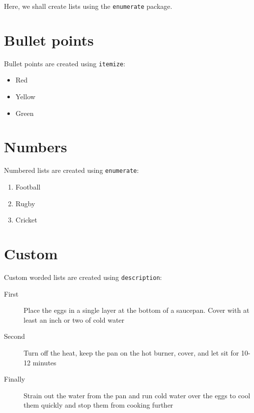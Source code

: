 \documentclass[a4paper,12pt]{article}
\begin{document}
Here, we shall create lists using the \texttt{enumerate} package.

\section{Bullet points}
Bullet points are created using \texttt{itemize}:

\begin{itemize}
  \item Red
  \item Yellow
  \item Green
\end{itemize}

\section{Numbers}
Numbered lists are created using \texttt{enumerate}:

\begin{enumerate}
  \item Football
  \item Rugby
  \item Cricket
\end{enumerate}

\section{Custom}
Custom worded lists are created using \texttt{description}:

\begin{description}
  \item[First] Place the eggs in a single layer at the bottom of a saucepan. Cover with at least an inch or two of cold water
  \item[Second] Turn off the heat, keep the pan on the hot burner, cover, and let sit for 10-12 minutes
  \item[Finally] Strain out the water from the pan and run cold water over the eggs to cool them quickly and stop them from cooking further
\end{description}
\end{document}

